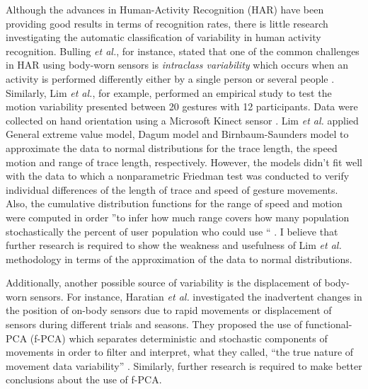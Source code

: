 \documentclass[9pt,journal,onecolumn,compsoc]{IEEEtran}
\begin{document}
Although the advances in Human-Activity Recognition (HAR) have been providing good results in terms of recognition rates,
there is little research investigating the automatic classification of variability in human activity recognition.
Bulling \textit{et al.}, for instance, stated that one of the common challenges in HAR 
using body-worn sensors is \textit{intraclass variability} which occurs when 
an activity is performed differently either by a single person or several people \cite{bulling2014} . 
Similarly, Lim \textit{et al.}, for example, performed an empirical study to test the motion variability 
presented between 20 gestures with 12 participants. %
Data were collected on hand orientation using a Microsoft Kinect sensor \cite{Lim2012}. %
Lim \textit{et al.} 
applied General extreme value model, Dagum model and Birnbaum-Saunders model 
to approximate the data to normal distributions 
for the trace length, the speed motion and range of trace length, respectively.
However, the models didn't fit well with the data to which a nonparametric Friedman test
was conducted to verify individual differences
of the length of trace and speed of gesture movements.
Also, the cumulative distribution functions for
the range of speed and motion were computed 
in order ''to infer how much range covers how many population stochastically 
the percent of user population who could use `` \cite{Lim2012}. 
I believe that further research is required to show the weakness and usefulness of 
Lim \textit{et al.}  methodology in terms of the approximation of the data to normal distributions.

Additionally, another possible source of variability is the displacement of body-worn sensors. 
For instance, Haratian \textit{et al.} investigated the inadvertent changes in the position of on-body sensors 
due to rapid movements or displacement of sensors during different trials and seasons.
They proposed the use of functional-PCA (f-PCA)
which separates deterministic and stochastic components of movements
in order to filter and interpret, what they called, ``the true nature of movement data variability'' 
\cite{Haratian2012,Haratian2014,Haratian2016}. Similarly, further research is required to make
better conclusions about the use of f-PCA.
\end{document}
